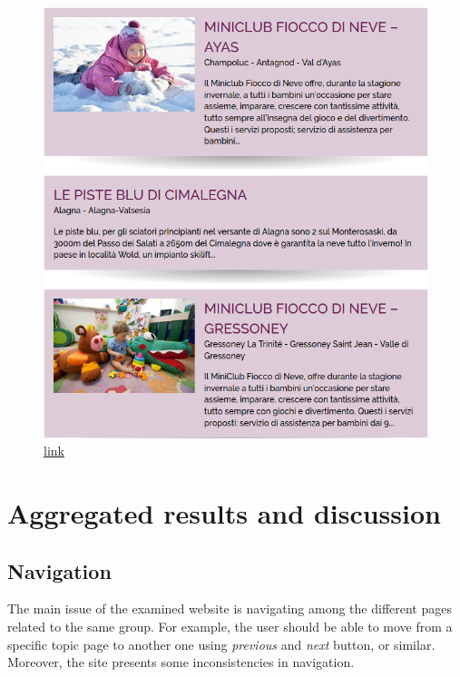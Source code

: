 \documentclass[a4paper, 11pt, parskip=half, headsepline]{scrreprt}
\begin{document}
\begin{figure}[H]
	\centering
	\begin{minipage}[t]{0.5\textwidth}
		\centering
		\includegraphics[width=1\linewidth, keepaspectratio]{103-consistency-missing-images}
		\caption{\href{https://www.visitmonterosa.com/experience-monterosa/famigliare/fun-for-kids/}{link}}
		\label{fig:consistency-03}
	\end{minipage} 
\end{figure}




\chapter{Aggregated results and discussion}
\label{chapter:results}

\section{Navigation}

The main issue of the examined website is navigating among the different pages related to the same group. For example, the user should be able to move from a specific topic page to another one using \textit{previous} and \textit{next} button, or similar. Moreover, the site presents some inconsistencies in navigation.
\end{document}
